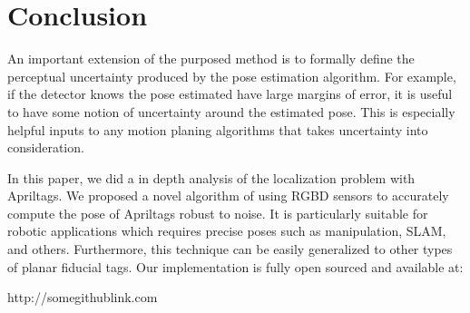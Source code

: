 \section{Conclusion}
\label{sec:conclusion}
An important extension of the purposed method is to formally define the perceptual uncertainty produced by the pose estimation algorithm. For example, if the detector knows the pose estimated have large margins of error, it is useful to have some notion of uncertainty around the estimated pose. This is especially helpful inputs to any motion planing algorithms that takes uncertainty into consideration.

In this paper, we did a in depth analysis of the localization problem with Apriltags. We proposed a novel algorithm of using RGBD sensors to accurately compute the pose of Apriltags robust to noise. It is particularly suitable for robotic applications which requires precise poses such as manipulation, SLAM, and others. Furthermore, this technique can be easily generalized to other types of planar fiducial tags. Our implementation is fully open sourced and available at:

	http://somegithublink.com